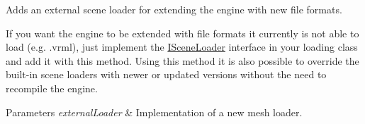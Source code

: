 Adds an external scene loader for extending the engine with new file formats. 

If you want the engine to be extended with file formats it currently is not able to load (e.\+g. .vrml), just implement the \hyperlink{classirr_1_1scene_1_1ISceneLoader}{I\+Scene\+Loader} interface in your loading class and add it with this method. Using this method it is also possible to override the built-\/in scene loaders with newer or updated versions without the need to recompile the engine. 
\begin{DoxyParams}{Parameters}
{\em external\+Loader} & Implementation of a new mesh loader. \\
\hline
\end{DoxyParams}
\mbox{\label{classirr_1_1scene_1_1ISceneManager_a2eb986c6975ebc1aa1f68c878ac8dcda}} 
